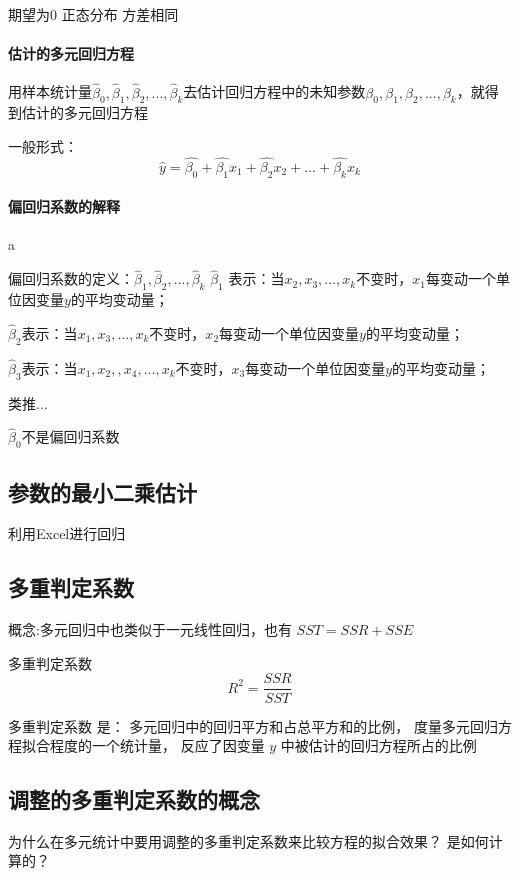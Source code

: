 \documentclass[UTF8,10pt]{book}
\begin{document}
期望为0 正态分布 方差相同

\paragraph{估计的多元回归方程}	用样本统计量$ \hat{\beta}_0,\hat{\beta}_1,\hat{\beta}_2,...,\hat{\beta}_k $去估计回归方程中的未知参数$\beta_0,\beta_1,\beta_2,...,\beta_k$，就得到估计的多元回归方程 

一般形式：
$$\hat{y} = \hat{\beta_0} + \hat{\beta_1} x_1 + \hat{\beta_2} x_2 + ... + \hat{\beta_k} x_k$$

\paragraph{偏回归系数的解释}	a

偏回归系数的定义：$ \hat{\beta}_1,\hat{\beta}_2,...,\hat{\beta}_k $ $\hat{\beta}_1$
表示：当$ x_2,x_3,...,x_k$不变时，$x_1$每变动一个单位因变量$y$的平均变动量； 

$\hat{\beta}_2$表示：当$ x_1,x_3,...,x_k$不变时，$x_2$每变动一个单位因变量$y$的平均变动量；

$\hat{\beta}_3$表示：当$ x_1,x_2,,x_4,...,x_k$不变时，$x_3$每变动一个单位因变量$y$的平均变动量； 

类推... 

$\hat{\beta}_0 $不是偏回归系数


\subsection{参数的最小二乘估计}
	
利用Excel进行回归	

\subsection{多重判定系数}
概念:多元回归中也类似于一元线性回归，也有 $ SST = SSR + SSE $ 

多重判定系数 
$$ R^2 = \frac{SSR}{SST} $$ 

多重判定系数 是： 多元回归中的回归平方和占总平方和的比例，
度量多元回归方程拟合程度的一个统计量，
反应了因变量 $y$ 中被估计的回归方程所占的比例

\subsection{调整的多重判定系数的概念}

为什么在多元统计中要用调整的多重判定系数来比较方程的拟合效果？ 是如何计算的？ 
\end{document}
